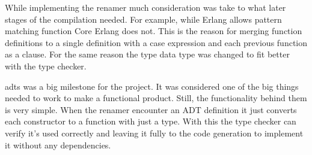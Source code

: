 While implementing the renamer much consideration was take to what later stages of the compilation needed. For example, while Erlang allows pattern matching function Core Erlang does not. This is the reason for merging function definitions to a single definition with a case expression and each previous function as a clause. For the same reason the type data type was changed to fit better with the type checker. 

\Acrlong{adt}s was a big milestone for the project. It was considered one of the big things needed to work to make a functional product. Still, the functionality behind them is very simple. When the renamer encounter an ADT definition it just converts each constructor to a function with just a type. With this the type checker can verify it's used correctly and leaving it fully to the code generation to implement it without any dependencies. 
